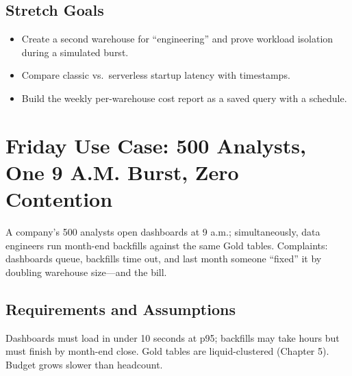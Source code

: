 \subsection*{Stretch Goals}
\begin{itemize}
    \item Create a second warehouse for ``engineering'' and prove workload isolation during a simulated burst.
    \item Compare classic vs.\ serverless startup latency with timestamps.
    \item Build the weekly per-warehouse cost report as a saved query with a schedule.
\end{itemize}

\section{Friday Use Case: 500 Analysts, One 9 A.M. Burst, Zero Contention}
A company's 500 analysts open dashboards at 9 a.m.; simultaneously, data engineers run month-end backfills against the same Gold tables. Complaints: dashboards queue, backfills time out, and last month someone ``fixed'' it by doubling warehouse size---and the bill.

\subsection{Requirements and Assumptions}
Dashboards must load in under 10 seconds at p95; backfills may take hours but must finish by month-end close. Gold tables are liquid-clustered (Chapter 5). Budget grows slower than headcount.

